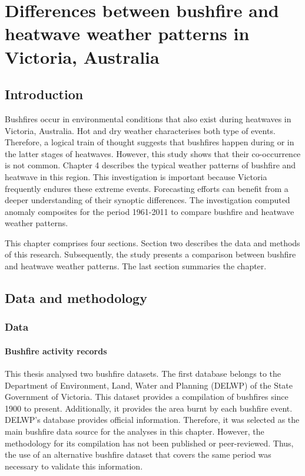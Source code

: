 
\chapter{Differences between bushfire and heatwave weather patterns in Victoria, Australia}
\newpage{}

\section{Introduction}

Bushfires occur in environmental conditions that also exist during
heatwaves in Victoria, Australia. Hot and dry weather characterises
both type of events. Therefore, a logical train of thought suggests
that bushfires happen during or in the latter stages of heatwaves.
However, this study shows that their co-occurrence is not common.
Chapter 4 describes the typical weather patterns of bushfire and heatwave
in this region. This investigation is important because Victoria frequently
endures these extreme events. Forecasting efforts can benefit from
a deeper understanding of their synoptic differences. The investigation
computed anomaly composites for the period 1961-2011 to compare bushfire
and heatwave weather patterns.

This chapter comprises four sections. Section two describes the data
and methods of this research. Subsequently, the study presents a comparison
between bushfire and heatwave weather patterns. The last section summaries the chapter.


\section{Data and methodology\label{sec:Data-and-methodology}}


\subsection{Data}


\subsubsection{Bushfire activity records}

This thesis analysed two bushfire datasets. The first database belongs
to the Department of Environment, Land, Water and Planning (DELWP)
of the State Government of Victoria. This dataset provides a compilation
of bushfires since 1900 to present. Additionally, it provides the
area burnt by each bushfire event. DELWP's database provides official
information. Therefore, it was selected as the main bushfire data
source for the analyses in this chapter. However, the methodology
for its compilation has not been published or peer-reviewed. Thus,
the use of an alternative bushfire dataset that covers the same period
was necessary to validate this information.

